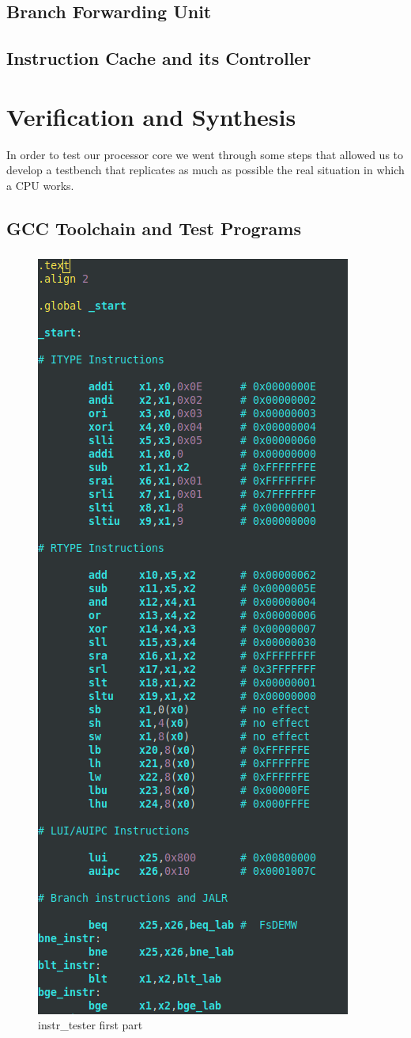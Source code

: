 \documentclass[10pt,  english, makeidx, a4paper, titlepage, oneside]{book}
\begin{document}
\section{Branch Forwarding Unit}

\section{Instruction Cache and its Controller}


\chapter{Verification and Synthesis}
In order to test our processor core we went through some steps that allowed us to develop a testbench that replicates as much as possible the real situation in which a CPU works.

\section{GCC Toolchain and Test Programs}

\begin{figure}
\paragraph{}
\vspace*{-\parskip}	\centering
    \includegraphics[width=.28\textwidth]{pics/instr_tester1.png}
    \caption{instr\_tester first part}
    \label{fig:instr_tester_1}
\end{figure}
\end{document}
